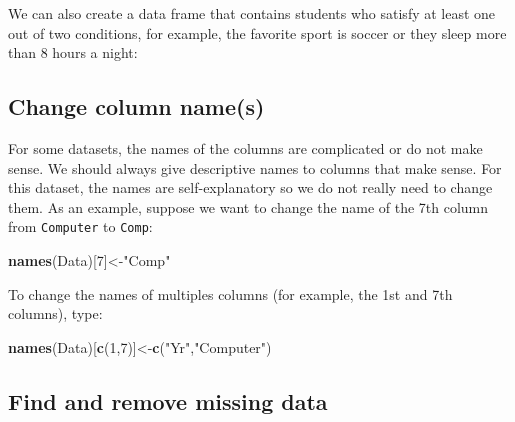 \documentclass[
]{book}
\newenvironment{Shaded}{\begin{snugshade}}{\end{snugshade}}
\newcommand{\DecValTok}[1]{\textcolor[rgb]{0.00,0.00,0.81}{#1}}
\newcommand{\FunctionTok}[1]{\textcolor[rgb]{0.13,0.29,0.53}{\textbf{#1}}}
\newcommand{\NormalTok}[1]{#1}
\newcommand{\OtherTok}[1]{\textcolor[rgb]{0.56,0.35,0.01}{#1}}
\newcommand{\SpecialCharTok}[1]{\textcolor[rgb]{0.81,0.36,0.00}{\textbf{#1}}}
\newcommand{\StringTok}[1]{\textcolor[rgb]{0.31,0.60,0.02}{#1}}
\begin{document}
We can also create a data frame that contains students who satisfy at least one out of two conditions, for example, the favorite sport is soccer or they sleep more than 8 hours a night:

\begin{Shaded}
\end{Shaded}

\hypertarget{change-column-names}{%
\subsection{Change column name(s)}\label{change-column-names}}

For some datasets, the names of the columns are complicated or do not make sense. We should always give descriptive names to columns that make sense. For this dataset, the names are self-explanatory so we do not really need to change them. As an example, suppose we want to change the name of the 7th column from \texttt{Computer} to \texttt{Comp}:

\begin{Shaded}
\begin{Highlighting}[]
\FunctionTok{names}\NormalTok{(Data)[}\DecValTok{7}\NormalTok{]}\OtherTok{\textless{}{-}}\StringTok{"Comp"}
\end{Highlighting}
\end{Shaded}

To change the names of multiples columns (for example, the 1st and 7th columns), type:

\begin{Shaded}
\begin{Highlighting}[]
\FunctionTok{names}\NormalTok{(Data)[}\FunctionTok{c}\NormalTok{(}\DecValTok{1}\NormalTok{,}\DecValTok{7}\NormalTok{)]}\OtherTok{\textless{}{-}}\FunctionTok{c}\NormalTok{(}\StringTok{"Yr"}\NormalTok{,}\StringTok{"Computer"}\NormalTok{)}
\end{Highlighting}
\end{Shaded}

\hypertarget{find-and-remove-missing-data}{%
\subsection{Find and remove missing data}\label{find-and-remove-missing-data}}
\end{document}
